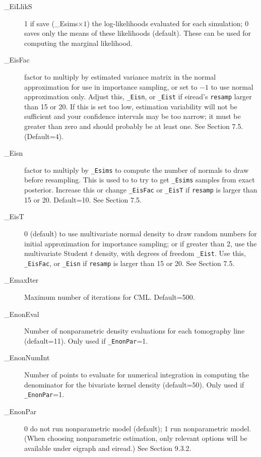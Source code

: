 \documentclass[11pt,titlepage]{article}
\begin{document}
\begin{description}
\item[\_EiLlikS] 1 if save (\_Esims$\times 1$) the log-likelihoods
  evaluated for each simulation; 0 saves only the means of these
  likelihoods (default).  These can be used for computing the marginal
  likelihood.

\item[\_EisFac] factor to multiply by estimated variance matrix in the
  normal approximation for use in importance sampling, or set to $-1$
  to use normal approximation only.  Adjust this, \texttt{\_Eisn}, or
  \texttt{\_Eist} if eiread's \texttt{resamp} larger than 15 or 20.
  If this is set too low, estimation variability will not be
  sufficient and your confidence intervals may be too narrow; it must
  be greater than zero and should probably be at least one.  See
  Section 7.5. (Default=4).

\item[\_Eisn] factor to multiply by \texttt{\_Esims} to compute the
  number of normals to draw before resampling.  This is used to to try
  to get \texttt{\_Esims} samples from exact posterior.  Increase this
  or change \texttt{\_EisFac} or \texttt{\_EisT} if \texttt{resamp} is
  larger than 15 or 20.  Default=10.  See Section 7.5.

\item[\_EisT] 0 (default) to use multivariate normal density to draw
  random numbers for initial approximation for importance sampling; or
  if greater than 2, use the multivariate Student $t$ density, with
  degrees of freedom \texttt{\_Eist}.  Use this, \texttt{\_EisFac}, or
  \texttt{\_Eisn} if \texttt{resamp} is larger than 15 or 20.  See
  Section 7.5.

\item[\_EmaxIter] Maximum number of iterations for CML.  Default=500.

\item[\_EnonEval] Number of nonparametric density evaluations for each
  tomography line (default=11).  Only used if \texttt{\_EnonPar}=1.

\item[\_EnonNumInt] Number of points to evaluate for numerical
  integration in computing the denominator for the bivariate kernel
  density (default=50).  Only used if \texttt{\_EnonPar}=1.

\item[\_EnonPar] 0 do not run nonparametric model (default); 1 run
  nonparametric model.  (When choosing nonparametric estimation, only
  relevant options will be available under eigraph and eiread.)  See
  Section 9.3.2.


\end{description}
\end{document}
